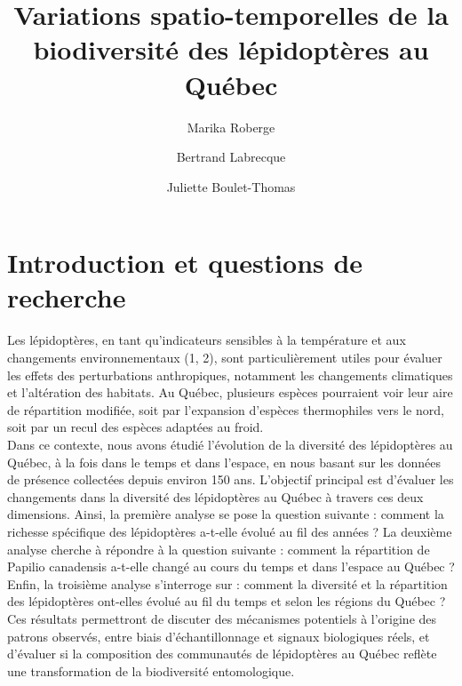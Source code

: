 \documentclass[9pt,twocolumn,twoside,]{pnas-new}
\title{Variations spatio-temporelles de la biodiversité des lépidoptères
au Québec}
\author[a]{Marika Roberge}
\author[a]{Bertrand Labrecque}
\author[a]{Juliette Boulet-Thomas}
\affil[a]{Faculté des sciences, Département de biologie, 2500
Boulevard de l'Université, Sherbrooke, Québec, J1K 2R1}
\begin{document}
\verticaladjustment{-2pt}



\maketitle
\thispagestyle{firststyle}


\acknow{}

\section{Introduction et questions de
recherche}\label{introduction-et-questions-de-recherche}

Les lépidoptères, en tant qu'indicateurs sensibles à la température et
aux changements environnementaux (1, 2), sont particulièrement utiles
pour évaluer les effets des perturbations anthropiques, notamment les
changements climatiques et l'altération des habitats. Au Québec,
plusieurs espèces pourraient voir leur aire de répartition modifiée,
soit par l'expansion d'espèces thermophiles vers le nord, soit par un
recul des espèces adaptées au froid.\\
Dans ce contexte, nous avons étudié l'évolution de la diversité des
lépidoptères au Québec, à la fois dans le temps et dans l'espace, en
nous basant sur les données de présence collectées depuis environ 150
ans. L'objectif principal est d'évaluer les changements dans la
diversité des lépidoptères au Québec à travers ces deux dimensions.
Ainsi, la première analyse se pose la question suivante : comment la
richesse spécifique des lépidoptères a-t-elle évolué au fil des années ?
La deuxième analyse cherche à répondre à la question suivante : comment
la répartition de Papilio canadensis a-t-elle changé au cours du temps
et dans l'espace au Québec ? Enfin, la troisième analyse s'interroge sur
: comment la diversité et la répartition des lépidoptères ont-elles
évolué au fil du temps et selon les régions du Québec ?\\
Ces résultats permettront de discuter des mécanismes potentiels à
l'origine des patrons observés, entre biais d'échantillonnage et signaux
biologiques réels, et d'évaluer si la composition des communautés de
lépidoptères au Québec reflète une transformation de la biodiversité
entomologique.
\end{document}
